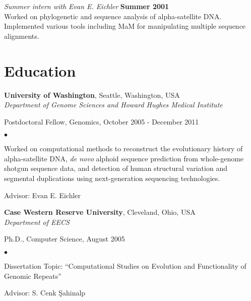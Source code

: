 \documentclass[margin,line]{res}
\newenvironment{list1}{
  \begin{list}{\ding{113}}{%
      \setlength{\itemsep}{0in}
      \setlength{\parsep}{0in} \setlength{\parskip}{0in}
      \setlength{\topsep}{0in} \setlength{\partopsep}{0in} 
      \setlength{\leftmargin}{0.17in}}}{\end{list}}
\newenvironment{list2}{
  \begin{list}{$\bullet$}{%
      \setlength{\itemsep}{0in}
      \setlength{\parsep}{0in} \setlength{\parskip}{0in}
      \setlength{\topsep}{0in} \setlength{\partopsep}{0in} 
      \setlength{\leftmargin}{0.2in}}}{\end{list}}
\begin{document}
\begin{resume}
{                                                \vspace{-.2cm}
                                                       {\em Summer intern with Evan E. Eichler} \hfill {\bf Summer 2001}\\
                                                       Worked on phylogenetic and sequence analysis of alpha-satellite
                                                       DNA. Implemented various tools including MaM for manipulating multiple
                                                       sequence alignments.
                                       }
                                       
  \section{\sc Education}
          {\bf University of Washington}, Seattle, Washington, USA\\
          {\em Department of Genome Sciences and Howard Hughes Medical Institute} \\
          \vspace*{-.1in}
          \begin{list1}
          \item[] Postdoctoral Fellow, Genomics, October 2005 - December 2011
            \begin{list2}
              \vspace*{.05in}
            \item
              Worked on computational methods to reconstruct
              the evolutionary history of alpha-satellite DNA, {\it de novo} alphoid sequence prediction
              from whole-genome shotgun sequence data, and detection of human structural variation and segmental duplications using next-generation
              sequencing technologies.
            \item Advisor: Evan E. Eichler
            \end{list2}
          \end{list1}
          
          {\bf Case Western Reserve University}, Cleveland, Ohio, USA\\
          {\em Department of EECS} \\
          \vspace*{-.1in}
          \begin{list1}
          \item[] Ph.D., Computer Science, August 2005
            \begin{list2}
              \vspace*{.05in}
            \item Dissertation Topic:  ``Computational Studies on Evolution and Functionality of Genomic Repeats''
            \item Advisor:  S. Cenk \c{S}ahinalp
            \end{list2}
          \end{list1}
          

\end{resume}
\end{document}
